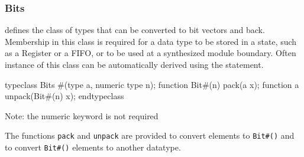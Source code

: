 \subsubsection{Bits}

 defines the class of types that can be converted to bit
vectors  and back.  Membership in this class is required for a data
type to be stored in a state, such as  a Register or a FIFO, or to be used
at a synthesized module boundary.   Often instance of this
class can be automatically derived using the  statement.


\begin{libverbatim}
   typeclass Bits #(type a, numeric type n);
       function Bit#(n) pack(a x);
       function a unpack(Bit#(n) x);
   endtypeclass
\end{libverbatim}
Note: the numeric keyword is not required

The functions {\tt pack} and {\tt unpack} are provided to convert
elements to {\tt Bit\#()} and to convert {\tt Bit\#()} elements to another datatype.

